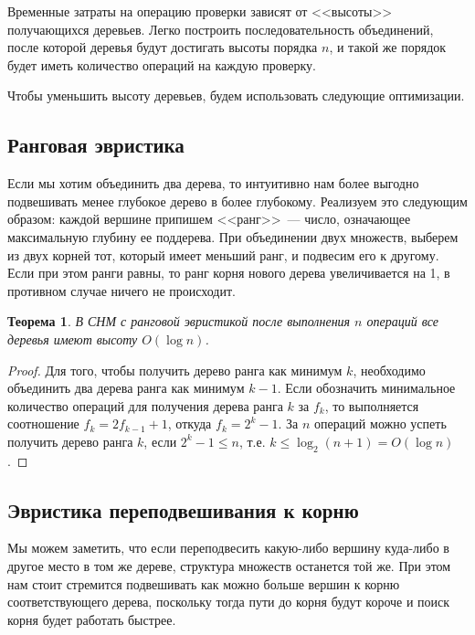 \documentclass[12pt]{article}
\newtheorem*{theorem*}{Теорема}
\renewcommand{\leq}{\leqslant}
\begin{document}
Временные затраты на операцию проверки зависят от <<высоты>> получающихся деревьев. Легко построить последовательность объединений, после которой деревья будут достигать высоты порядка $n$, и такой же порядок будет иметь количество операций на каждую проверку.

Чтобы уменьшить высоту деревьев, будем использовать следующие оптимизации.

\subsection{Ранговая эвристика}

Если мы хотим объединить два дерева, то интуитивно нам более выгодно подвешивать менее глубокое дерево в более глубокому. Реализуем это следующим образом: каждой вершине припишем <<ранг>>~--- число, означающее максимальную глубину ее поддерева. При объединении двух множеств, выберем из двух корней тот, который имеет меньший ранг, и подвесим его к другому. Если при этом ранги равны, то ранг корня нового дерева увеличивается на 1, в 
противном случае ничего не происходит.

\begin{theorem*}

В СНМ с ранговой эвристикой после выполнения $n$ операций все деревья имеют высоту $O(\log n)$.

\end{theorem*}

\begin{proof}

Для того, чтобы получить дерево ранга как минимум $k$, необходимо объединить два дерева ранга как минимум $k - 1$. Если обозначить минимальное количество операций для получения дерева ранга $k$ за $f_k$, то выполняется соотношение $f_k = 2f_{k-1} + 1$, откуда $f_k = 2^k - 1$. За $n$ операций можно успеть получить дерево ранга $k$, если $2^k - 1 \leq n$, т.е. $k \leq \log_2(n + 1) = O(\log n)$.

\end{proof}

\subsection{Эвристика переподвешивания к корню}

Мы можем заметить, что если переподвесить какую-либо вершину куда-либо в другое место в том же дереве, структура множеств останется той же. При этом нам стоит стремится подвешивать как можно больше вершин к корню соответствующего дерева, поскольку тогда пути до корня будут короче и поиск корня будет работать быстрее.
\end{document}
